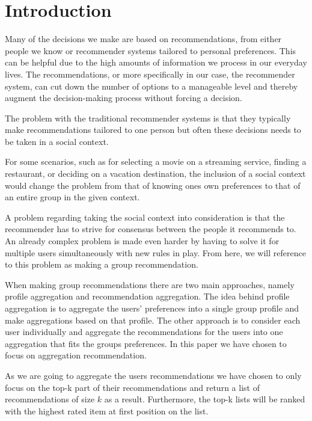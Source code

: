 \section{Introduction}
Many of the decisions we make are based on recommendations, from either people we know or recommender systems tailored to personal preferences. This can be helpful due to the high amounts of information we process in our everyday lives\cite{Edwards2001}. The recommendations, or more specifically in our case, the recommender system, can cut down the number of options to a manageable level and thereby augment the decision-making process without forcing a decision.

The problem with the traditional recommender systems is that they typically make recommendations tailored to one person but often these decisions needs to be taken in a social context. 

For some scenarios, such as for selecting a movie on a streaming service, finding a restaurant, or deciding on a vacation destination, the inclusion of a social context would change the problem from that of knowing ones own preferences to that of an entire group in the given context.

A problem regarding taking the social context into consideration is that the recommender has to strive for consensus between the people it recommends to. An already complex problem is made even harder by having to solve it for multiple users simultaneously with new rules in play. From here, we will reference to this problem as making a group recommendation.

When making group recommendations there are two main approaches, namely profile aggregation and recommendation aggregation\cite{profilvsrec}. The idea behind profile aggregation is to aggregate the users' preferences into a single group profile and make aggregations based on that profile. The other approach is to consider each user individually and aggregate the recommendations for the users into one aggregation that fits the groups preferences. In this paper we have chosen to focus on aggregation recommendation.


As we are going to aggregate the users recommendations we have chosen to only focus on the top-k part of their recommendations and return a list of recommendations of size $k$ as a result. Furthermore, the top-k lists will be ranked with the highest rated item at first position on the list.

